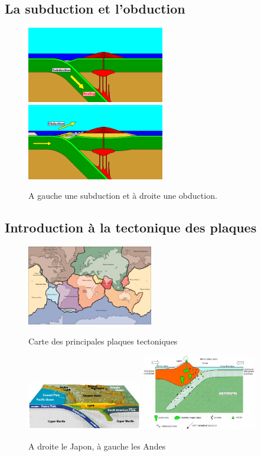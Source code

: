\documentclass{beamer}
\begin{document}
\subsection{La subduction et l'obduction}
\begin{frame}
  \begin{figure}
    \begin{center}
      \includegraphics[width=6cm]{Images/subduction.png}
      \includegraphics[width=6cm]{Images/obduction.png}
      \caption{A gauche une subduction et à droite une obduction.}
    \end{center}
  \end{figure}
\end{frame}

\subsection{Introduction à la tectonique des plaques}
\begin{frame}
  \begin{center}
    \begin{figure}
      \includegraphics[width=5.5cm]{Images/Images_Alexis/plaques.png}
      \caption{Carte des principales plaques tectoniques}
      \includegraphics[width=5cm]{Images/Images_Alexis/andes.jpg}
      \includegraphics[width=5cm]{Images/Images_Alexis/japon.jpg}
      \caption{A droite le Japon, à gauche les Andes}
    \end{figure}
  \end{center}
\end{frame}
\end{document}
